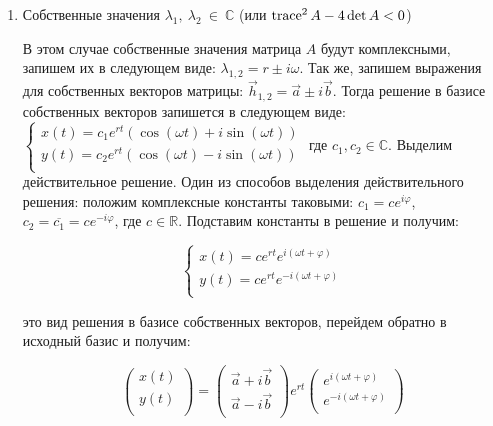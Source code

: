\begin{enumerate}
\begin{enumerate}
	\end{enumerate}
	
	\item Собственные значения  $\lambda_1, ~ \lambda_2 ~ \in ~ \mathbb{C}$ (или $\operatorname{trace}^2 A - 4 \det A < 0$)
	
	В этом случае собственные значения матрица $A$ будут комплексными, запишем их в следующем виде:
	$\lambda_{1, 2} = r \pm i \omega$. Так же, запишем выражения для собственных векторов матрицы:
	$\vec{h}_{1, 2} = \vec{a} \pm i \vec{b}$. Тогда решение в базисе собственных векторов запишется в следующем виде:
  $\begin{cases}
  	x(t) = c_1 e^{r t}(\cos (\omega t) + i \sin (\omega t)) \\
  	y(t) = c_2 e^{r t}(\cos (\omega t) - i \sin (\omega t)) \\
  \end{cases}$
  где $c_1, c_2 \in \mathbb{C}$. Выделим действительное решение. Один из способов выделения действительного решения: положим комплексные константы таковыми: $c_1 = c e^{i \varphi}$, $c_2 = \overline{c_1} = c e^{-i \varphi}$, где $c \in \mathbb{R}$. Подставим константы в решение и получим:
  
  \begin{equation}
  	\begin{cases}
  		x(t) = c e^{r t} e^{i(\omega t + \varphi)} \\
  		y(t) = c e^{r t} e^{-i(\omega t + \varphi)} \\
  	\end{cases}
  \end{equation}
  
  это вид решения в базисе собственных векторов, перейдем обратно в исходный базис и получим:

  \begin{equation}
    \begin{pmatrix}
      x(t) \\
      y(t) \\
    \end{pmatrix} = 
    \begin{pmatrix}
      \vec{a} + i \vec{b} \\
      \vec{a} - i \vec{b} \\
    \end{pmatrix}
    e^{r t}
    \begin{pmatrix}
      e^{i(\omega t + \varphi)} \\
      e^{-i(\omega t + \varphi)} \\
    \end{pmatrix}
  \end{equation}


\end{enumerate}
